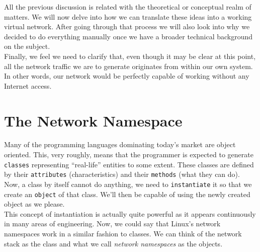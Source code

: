         All the previous discussion is related with the theoretical or conceptual realm of matters. We will now delve into how we can translate these ideas into a working virtual network. After going through that process we will also look into why we decided to do everything manually once we have a broader technical background on the subject.\\

        Finally, we feel we need to clarify that, even though it may be clear at this point, all the network traffic we are to generate originates from within our own system. In other words, our network would be perfectly capable of working without any Internet access.\\

    \section{The Network Namespace}


        Many of the programming languages dominating today's market are object oriented. This, very roughly, means that the programmer is expected to generate \texttt{classes} representing ``real-life'' entities to some extent. These classes are defined by their \texttt{attributes} (characteristics) and their \texttt{methods} (what they can do). Now, a class by itself cannot do anything, we need to \texttt{instantiate} it so that we create an \texttt{object} of that class. We'll then be capable of using the newly created object as we please.\\

        This concept of instantiation is actually quite powerful as it appears continuously in many areas of engineering. Now, we could say that Linux's network namespaces work in a similar fashion to classes. We can think of the network stack as the class and what we call \textit{network namespaces} as the objects.\\

